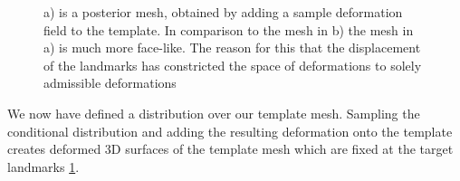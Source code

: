 \begin{figure}[h!]
    \centering
    \quad\quad
    \caption{a) is a posterior mesh, obtained by adding a sample deformation field to the template. In comparison to the mesh in b) the mesh in a) is much more face-like. The reason for this that the displacement of the landmarks has constricted the space of deformations to solely admissible deformations}
\label{fig:meshposterior}
\end{figure}
We now have defined a distribution over our template mesh. Sampling the conditional distribution and adding the resulting deformation onto the template creates deformed 3D surfaces of the template mesh which are fixed at the target landmarks \ref{fig:meshposterior}.

